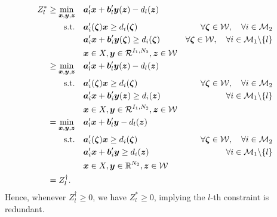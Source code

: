\documentclass[fleqn,orsc,blindrev]{informs4}
\newcommand{\mb}[1]{\mbox{\boldmath \ensuremath{#1}}}
\begin{document}
\begin{equation*}
			\begin{aligned} 
				Z^*_l \geq	\min_{ \boldsymbol{x} , \boldsymbol{y}, \boldsymbol{z}} \quad & \mb{a}'_l\mb{x}+\mb{b}'_l \mb{y}(\mb{z}) - d_l(\mb{z})  \\
				{\rm s.t.}  \quad &  \mb{a}'_i(\mb{\zeta})\mb{x} \geq d_i(\mb{\zeta}) &  \forall  \mb{\zeta} \in  \mathcal{W}, \quad \forall i  \in \mathcal{M}_2 \\
				\quad & \mb{a}'_i\mb{x}+ \mb{b}'_i \mb{y}(\mb{\zeta}) \geq d_i(\mb{\zeta})  &  \forall  \mb{\zeta} \in  \mathcal{W},  \quad \forall i  \in \mathcal{M}_1 \backslash \{l\} \\
				\quad &\mb{x} \in X, \mb{y} \in \mathcal{R}^{I_1,N_2},  \mb{z} \in \mathcal{W}\\
				\geq \min_{ \boldsymbol{x} , \boldsymbol{y}, \boldsymbol{z}} \quad & \mb{a}'_l\mb{x}+\mb{b}'_l \mb{y}(\mb{z}) - d_l(\mb{z})  \\
				{\rm s.t.}  \quad &  \mb{a}'_i(\mb{\zeta})\mb{x} \geq d_i(\mb{\zeta}) &  \forall  \mb{\zeta} \in  \mathcal{W}, \quad \forall i  \in \mathcal{M}_2   \\
				\quad & \mb{a}'_i\mb{x}+ \mb{b}'_i \mb{y}(\mb{z}) \geq d_i(\mb{z})  &  \forall i  \in \mathcal{M}_1 \backslash \{l\} \\
				\quad &\mb{x} \in X, \mb{y} \in \mathcal{R}^{I_1,N_2},  \mb{z} \in \mathcal{W} \\
				= \min_{ \boldsymbol{x} , \boldsymbol{y}, \boldsymbol{z}} \quad & \mb{a}'_l\mb{x}+\mb{b}'_l \mb{y} - d_l(\mb{z})  \\
				{\rm s.t.}  \quad &  \mb{a}'_i(\mb{\zeta})\mb{x} \geq d_i(\mb{\zeta}) &  \forall  \mb{\zeta} \in  \mathcal{W}, \quad \forall i  \in \mathcal{M}_2\\
				\quad & \mb{a}'_i\mb{x}+ \mb{b}'_i \mb{y} \geq d_i(\mb{z})  &  \forall i  \in \mathcal{M}_1 \backslash \{l\} \\
				\quad & \mb{x} \in X, \mb{y} \in \mathbb{R}^{N_2},  \mb{z} \in \mathcal{W} \\
				= Z^\dag_l. \enskip \quad
			\end{aligned} 
\end{equation*}
		Hence, whenever $Z^\dag_l \geq 0$, we have $Z^*_l \geq 0$, implying the $l$-th constraint is redundant.  \hfill \Halmos \\
		
\end{document}
